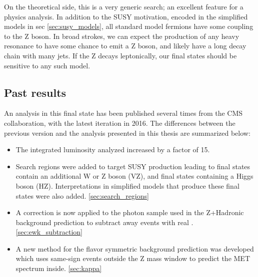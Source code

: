   On the theoretical side, this is a very generic search; an excellent feature for a physics analysis. In addition to the SUSY motivation, \cite{hz_theory, GMSB_theory, neutralino_theory} encoded in the simplified models in sec \ref{sec:susy_models}, all standard model fermions have some coupling to the Z boson. In broad strokes, we can expect the production of any heavy resonance to have some chance to emit a Z boson, and likely have a long decay chain with many jets. If the Z decays leptonically, our final states should be sensitive to any such model.

  \subsection{Past results}
  An analysis in this final state has been published several times from the CMS collaboration, with the latest iteration in 2016.\cite{paper_2012, paper_2015, paper_2016} The differences between the previous version and the analysis presented in this thesis are summarized below:
  \begin{itemize}
    \item The integrated luminosity analyzed increased by a factor of 15.
    \item Search regions were added to target SUSY production leading to final states contain an additional W or Z boson (VZ), and final states containing a Higgs boson (HZ). Interpretations in simplified models that produce these final states were also added. \ref{sec:search_regions}
    \item A correction is now applied to the photon sample used in the Z+Hadronic background prediction to subtract away events with real \MET. \ref{sec:ewk_subtraction}
    \item A new method for the flavor symmetric background prediction was developed which uses same-sign events outside the Z mass window to predict the MET spectrum inside. \ref{sec:kappa}
  \end{itemize}